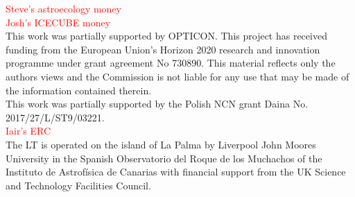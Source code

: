\documentclass{aa}
\begin{document}
\begin{acknowledgements}

    \textcolor{red}{Steve's astroecology money}\\
    
    \textcolor{red}{Josh's ICECUBE money}\\

    This work was partially supported by OPTICON. This project has
    received funding from the European Union’s Horizon 2020 research and
    innovation programme under grant agreement No 730890. This material
    reflects only the authors views and the Commission is not liable for
    any use that may be made of the information contained therein.\\
    
    This work was partially supported by the Polish NCN grant Daina
    No. 2017/27/L/ST9/03221.\\
    
    \textcolor{red}{Iair's ERC}\\
    
    The LT is operated on the island of La Palma by Liverpool
    John Moores University in the Spanish Observatorio del Roque
    de los Muchachos of the Instituto de Astrof{\'i}sica de Canarias with
    financial support from the UK Science and Technology Facilities
    Council.
\end{acknowledgements}

%
%



\end{document}
